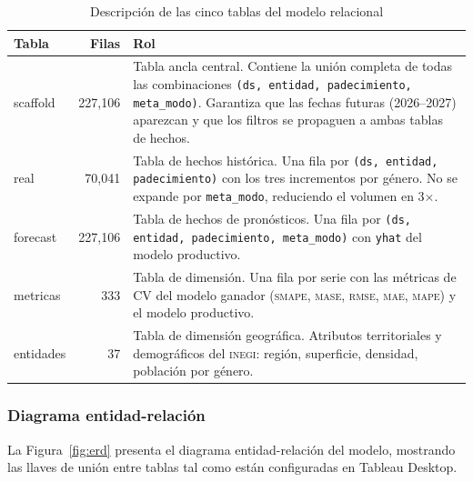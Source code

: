\documentclass[12pt, letterpaper]{article}
\newcommand{\smape}{\textnormal{\textsc{smape}}}
\newcommand{\mase}{\textnormal{\textsc{mase}}}
\newcommand{\rmse}{\textnormal{\textsc{rmse}}}
\newcommand{\mae}{\textnormal{\textsc{mae}}}
\newcommand{\mape}{\textnormal{\textsc{mape}}}
\newcommand{\figref}[1]{Figura~\ref{#1}}
\begin{document}
\begin{table}[H]
\centering
\caption{Descripción de las cinco tablas del modelo relacional}
\label{tab:tablas_tableau}
\small
\begin{tabularx}{\textwidth}{>{\ttfamily}l r X}
\toprule
\textbf{Tabla} & \textbf{Filas} & \textbf{Rol} \\
\midrule
scaffold  & 227,106 & Tabla ancla central. Contiene la unión completa de todas las combinaciones \texttt{(ds, entidad, padecimiento, meta\_modo)}. Garantiza que las fechas futuras (2026--2027) aparezcan y que los filtros se propaguen a ambas tablas de hechos. \\
real      & 70,041  & Tabla de hechos histórica. Una fila por \texttt{(ds, entidad, padecimiento)} con los tres incrementos por género. No se expande por \texttt{meta\_modo}, reduciendo el volumen en 3$\times$. \\
forecast  & 227,106 & Tabla de hechos de pronósticos. Una fila por \texttt{(ds, entidad, padecimiento, meta\_modo)} con \texttt{yhat} del modelo productivo. \\
metricas  & 333     & Tabla de dimensión. Una fila por serie con las métricas de CV del modelo ganador (\smape{}, \mase{}, \rmse{}, \mae{}, \mape{}) y el modelo productivo. \\
entidades & 37      & Tabla de dimensión geográfica. Atributos territoriales y demográficos del \textsc{inegi}: región, superficie, densidad, población por género. \\
\bottomrule
\end{tabularx}
\end{table}

\subsubsection{Diagrama entidad-relación}

La \figref{fig:erd} presenta el diagrama entidad-relación del modelo, mostrando las llaves de unión entre tablas tal como están configuradas en Tableau Desktop.
\end{document}
